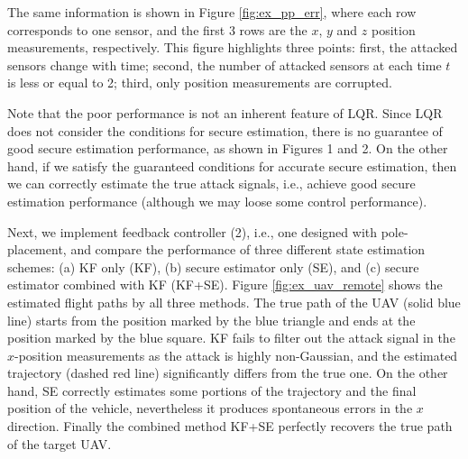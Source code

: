 \documentclass[../../thesis.tex]{subfiles}
\begin{document}
The same information is shown in Figure \ref{fig:ex_pp_err}, where each row corresponds to one sensor, and the first 3 rows are the $x$, $y$ and $z$ position measurements, respectively. This figure highlights three points: first, the attacked sensors change with time; second, the number of attacked sensors at each time $t$ is less or equal to 2; third, only position measurements are corrupted.

Note that the poor performance is not an inherent feature of LQR. 
Since LQR does not consider the conditions for secure estimation, there is no guarantee of good secure estimation performance, as shown in Figures 1 and 2.
On the other hand, if we satisfy the guaranteed conditions for accurate secure estimation, then we can correctly estimate the true attack signals, i.e., achieve good secure estimation performance (although we may loose some control performance).

Next, we implement feedback controller (2), i.e., one designed with pole-placement, and compare the performance of three different state estimation schemes: (a) KF only (KF), (b) secure estimator only (SE), and (c) secure estimator combined with KF (KF+SE). 
Figure \ref{fig:ex_uav_remote} shows the estimated flight paths by all three methods.
The true path of the UAV (solid blue line) starts from the position marked by the blue triangle and ends at the position marked by the blue square. KF fails to filter out the attack signal in the $x$-position measurements as the attack is highly non-Gaussian, and the estimated trajectory (dashed red line) significantly differs from the true one. On the other hand, SE correctly estimates some portions of the trajectory and the final position of the vehicle, nevertheless it produces spontaneous errors in the $x$ direction. 
Finally the combined method KF+SE perfectly recovers the true path of the target UAV.
\end{document}
